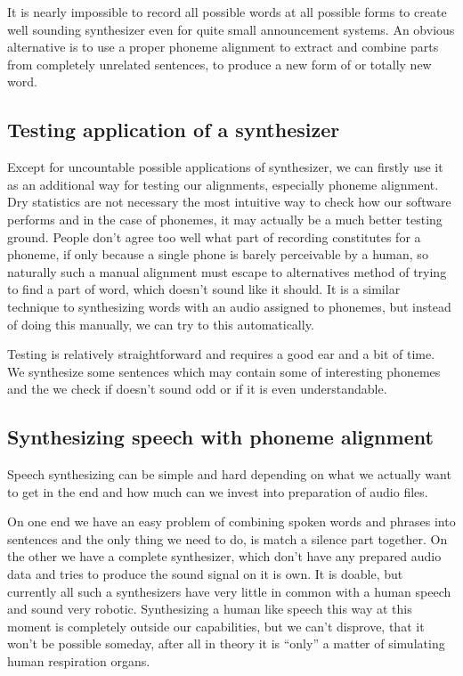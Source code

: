 \documentclass[12pt,a4paper,english]{article}
\begin{document}
It is nearly impossible to record all possible words at all possible forms to create well sounding synthesizer even for quite small announcement systems. An obvious alternative is to use a proper phoneme alignment to extract and combine parts from completely unrelated sentences, to produce a new form of or totally new word. \newline \newline

\subsection{Testing application of a synthesizer}

Except for uncountable possible applications of synthesizer, we can firstly use it as an additional way for testing our alignments, especially phoneme alignment. Dry statistics are not necessary the most intuitive way to check how our software performs and in the case of phonemes, it may actually be a much better testing ground. People don't agree too well what part of recording constitutes for a phoneme, if only because a single phone is barely perceivable by a human, so naturally such a manual alignment must escape to alternatives method of trying to find a part of word, which doesn't sound like it should. \newline
It is a similar technique to synthesizing words with an audio assigned to phonemes, but instead of doing this manually, we can try to this automatically. \newline

Testing is relatively straightforward and requires a good ear and a bit of time. We synthesize some sentences which may contain some of interesting phonemes and the we check if doesn't sound odd or if it is even understandable. 

\newpage
\subsection{Synthesizing speech with phoneme alignment}
Speech synthesizing can be simple and hard depending on what we actually want to get in the end and how much can we invest into preparation of audio files. \newline

On one end we have an easy problem of combining spoken words and phrases into sentences and the only thing we need to do, is match a silence part together. \newline
On the other we have a complete synthesizer, which don't have any prepared audio data and tries to produce the sound signal on it is own. It is doable, but currently all such a synthesizers have very little in common with a human speech and sound very robotic. Synthesizing a human like speech this way at this moment is completely outside our capabilities, but we can't disprove, that it won't be possible someday, after all in theory it is “only” a matter of simulating human respiration organs. \newline
\end{document}
